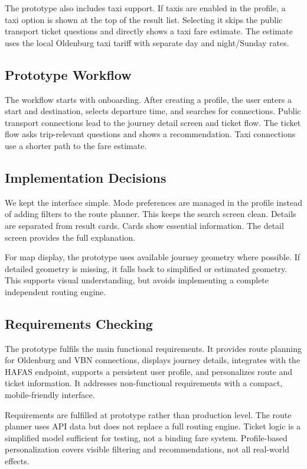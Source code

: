 \documentclass[12pt,a4paper]{article}
\begin{document}
The prototype also includes taxi support. If taxis are enabled in the profile, a taxi option is shown at the top of the result list. Selecting it skips the public transport ticket questions and directly shows a taxi fare estimate. The estimate uses the local Oldenburg taxi tariff with separate day and night/Sunday rates.

\subsection{Prototype Workflow}
The workflow starts with onboarding. After creating a profile, the user enters a start and destination, selects departure time, and searches for connections. Public transport connections lead to the journey detail screen and ticket flow. The ticket flow asks trip-relevant questions and shows a recommendation. Taxi connections use a shorter path to the fare estimate.

\subsection{Implementation Decisions}
We kept the interface simple. Mode preferences are managed in the profile instead of adding filters to the route planner. This keeps the search screen clean. Details are separated from result cards. Cards show essential information. The detail screen provides the full explanation.

For map display, the prototype uses available journey geometry where possible. If detailed geometry is missing, it falls back to simplified or estimated geometry. This supports visual understanding, but avoids implementing a complete independent routing engine.

\subsection{Requirements Checking}
The prototype fulfils the main functional requirements. It provides route planning for Oldenburg and VBN connections, displays journey details, integrates with the HAFAS endpoint, supports a persistent user profile, and personalizes route and ticket information. It addresses non-functional requirements with a compact, mobile-friendly interface.

Requirements are fulfilled at prototype rather than production level. The route planner uses API data but does not replace a full routing engine. Ticket logic is a simplified model sufficient for testing, not a binding fare system. Profile-based personalization covers visible filtering and recommendations, not all real-world effects.
\end{document}
